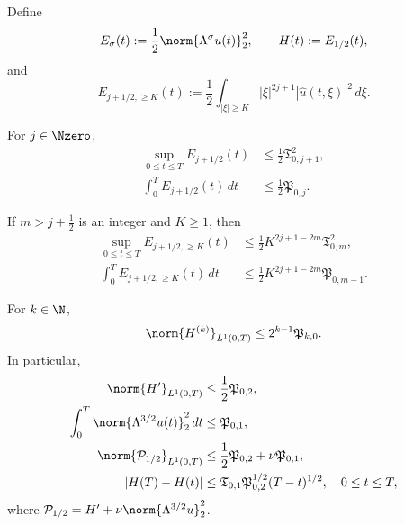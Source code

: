 \begin{proposition}
\label{prop:qc-critical-height}
Define
\[
 E_\sigma(t):=\frac12\norm{\Lambda^\sigma u(t)}_2^2,
 \qquad
 H(t):=E_{1/2}(t),
\]
and
\[
 E_{j+1/2,\ge K}(t)
 :=\frac12\int_{|\xi|\ge K}|\xi|^{2j+1}
 |\widehat u(t,\xi)|^2\,d\xi.
\]
\begin{samepage}
For \(j\in\Nzero\),
\begin{align}
 \sup_{0\le t\le T}E_{j+1/2}(t)
 &\le\frac12\mathfrak T_{0,j+1}^2,
 \label{eq:qc-critical-sup}\\
 \int_0^T E_{j+1/2}(t)\,dt
 &\le\frac12\mathfrak P_{0,j}.
 \label{eq:qc-critical-mass}
\end{align}
\end{samepage}
If \(m>j+\frac12\) is an integer and \(K\ge1\), then
\begin{align}
 \sup_{0\le t\le T}E_{j+1/2,\ge K}(t)
 &\le\frac12K^{2j+1-2m}\mathfrak T_{0,m}^2,
 \label{eq:qc-critical-tail-sup}\\
 \int_0^T E_{j+1/2,\ge K}(t)\,dt
 &\le\frac12K^{2j+1-2m}\mathfrak P_{0,m-1}.
 \label{eq:qc-critical-tail-mass}
\end{align}
\begin{samepage}
For \(k\in\N\),
\begin{equation}
 \norm{H^{(k)}}_{L^1(0,T)}
 \le2^{k-1}\mathfrak P_{k,0}.
 \label{eq:qc-height-derivatives}
\end{equation}
In particular,
\begin{align}
 \norm{H'}_{L^1(0,T)}
 &\le\frac12\mathfrak P_{0,2},
 \label{eq:qc-critical-variation}\\
 \int_0^T\norm{\Lambda^{3/2}u(t)}_2^2\,dt
 &\le\mathfrak P_{0,1},
 \label{eq:qc-critical-dissipation}\\
 \norm{\mathcal P_{1/2}}_{L^1(0,T)}
 &\le\frac12\mathfrak P_{0,2}+\nu\mathfrak P_{0,1},
 \label{eq:qc-critical-current}\\
 |H(T)-H(t)|
 &\le
 \mathfrak T_{0,1}\mathfrak P_{0,2}^{1/2}(T-t)^{1/2},
 \quad0\le t\le T,
 \label{eq:qc-critical-endpoint-modulus}
\end{align}
where
\(\mathcal P_{1/2}=H'+\nu\norm{\Lambda^{3/2}u}_2^2\).
\end{samepage}
\end{proposition}

